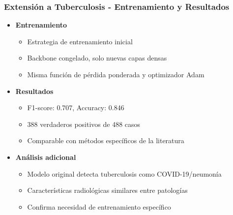 \begin{frame}
\frametitle{Extensión a Tuberculosis - Entrenamiento y Resultados}
\begin{itemize}
    \item \textbf{Entrenamiento}
    \begin{itemize}
        \item Estrategia de entrenamiento inicial
        \item Backbone congelado, solo nuevas capas densas
        \item Misma función de pérdida ponderada y optimizador Adam
    \end{itemize}
    \item \textbf{Resultados}
    \begin{itemize}
        \item F1-score: 0.707, Accuracy: 0.846
        \item 388 verdaderos positivos de 488 casos
        \item Comparable con métodos específicos de la literatura
    \end{itemize}
    \item \textbf{Análisis adicional}
    \begin{itemize}
        \item Modelo original detecta tuberculosis como COVID-19/neumonía
        \item Características radiológicas similares entre patologías
        \item Confirma necesidad de entrenamiento específico
    \end{itemize}
\end{itemize}
\end{frame}


